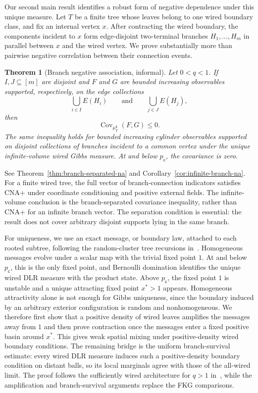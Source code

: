\documentclass[11pt]{amsart}
\theoremstyle{plain}
\newtheorem*{theorem*}{Theorem}
\theoremstyle{definition}
\theoremstyle{remark}
\newcommand{\pc}{p_{\mathsf{c}}}
\begin{document}
Our second main result identifies a robust form of negative dependence under this unique measure. Let $T$ be a finite tree whose leaves belong to one wired boundary class, and fix an internal vertex $x$. After contracting the wired boundary, the components incident to $x$ form edge-disjoint two-terminal branches $H_1,\ldots,H_m$ in parallel between $x$ and the wired vertex. We prove substantially more than pairwise negative correlation between their connection events.

\begin{theorem*}[Branch negative association, informal]
Let $0<q<1$. If $I,J\subseteq[m]$ are disjoint and $F$ and $G$ are bounded increasing observables supported, respectively, on the edge collections
\[
    \bigcup_{i\in I}E(H_i)
    \qquad\text{and}\qquad
    \bigcup_{j\in J}E(H_j),
\]
then
\[
    \operatorname{Cov}_{\mu_T^{\mathbf 1}}(F,G)
    \le0.
\]
The same inequality holds for bounded increasing cylinder observables supported on disjoint collections of branches incident to a common vertex under the unique infinite-volume wired Gibbs measure. At and below $\pc$, the covariance is zero.
\end{theorem*}

See Theorem~\ref{thm:branch-separated-na} and Corollary~\ref{cor:infinite-branch-na}. For a finite wired tree, the full vector of branch-connection indicators satisfies CNA+ under coordinate conditioning and positive external fields. The infinite-volume conclusion is the branch-separated covariance inequality, rather than CNA+ for an infinite branch vector. The separation condition is essential: the result does not cover arbitrary disjoint supports lying in the same branch.

For uniqueness, we use an exact message, or boundary law, attached to each rooted subtree, following the random-cluster tree recursions in~\cite{blancaEtAl2020sampling,blanca2023sampling}. Homogeneous messages evolve under a scalar map with the trivial fixed point $1$. At and below $\pc$, this is the only fixed point, and Bernoulli domination identifies the unique wired DLR measure with the product state. Above $\pc$, the fixed point $1$ is unstable and a unique attracting fixed point $x^*>1$ appears. Homogeneous attractivity alone is not enough for Gibbs uniqueness, since the boundary induced by an arbitrary exterior configuration is random and nonhomogeneous. We therefore first show that a positive density of wired leaves amplifies the messages away from $1$ and then prove contraction once the messages enter a fixed positive basin around $x^*$. This gives weak spatial mixing under positive-density wired boundary conditions. The remaining bridge is the uniform branch-survival estimate: every wired DLR measure induces such a positive-density boundary condition on distant balls, so its local marginals agree with those of the all-wired limit. The proof follows the sufficiently wired architecture for $q>1$ in~\cite{blanca2026uniqueness}, while the amplification and branch-survival arguments replace the FKG comparisons.
\end{document}
